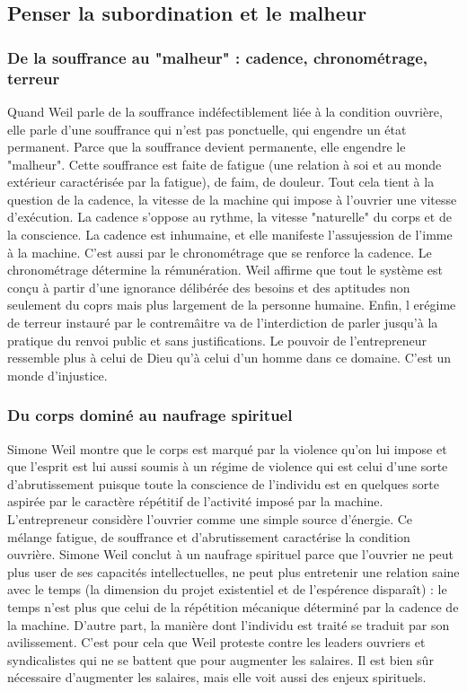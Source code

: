 \documentclass[a4paper,12pt]{book}
\begin{document}
\subsection{Penser la subordination et le malheur}
\subsubsection{De la souffrance au "malheur" : cadence, chronométrage, terreur}
Quand Weil parle de la souffrance indéfectiblement liée à la condition ouvrière, elle parle d'une souffrance qui n'est pas ponctuelle, qui engendre un état permanent. Parce que la souffrance devient permanente, elle engendre le "malheur". Cette souffrance est faite de fatigue (une relation à soi et au monde extérieur caractérisée par la fatigue), de faim, de douleur. Tout cela tient à la question de la cadence, la vitesse de la machine qui impose à l'ouvrier une vitesse d'exécution. La cadence s'oppose au rythme, la vitesse "naturelle" du corps et de la conscience. La cadence est inhumaine, et elle manifeste l'assujession de l'imme à la machine. C'est aussi par le chronométrage que se renforce la cadence. Le chronométrage détermine la rémunération. Weil affirme que tout le système est conçu à partir d'une ignorance délibérée des besoins et des aptitudes non seulement du coprs mais plus largement de la personne humaine. Enfin, l erégime de terreur instauré par le contremâitre va de l'interdiction de parler jusqu'à la pratique du renvoi public et sans justifications. Le pouvoir de l'entrepreneur ressemble plus à celui de Dieu qu'à celui d'un homme dans ce domaine. C'est un monde d'injustice.

\subsubsection{Du corps dominé au naufrage spirituel}
Simone Weil montre que le corps est marqué par la violence qu'on lui impose et que l'esprit est lui aussi soumis à un régime de violence qui est celui d'une sorte d'abrutissement puisque toute la conscience de l'individu est en quelques sorte aspirée par le caractère répétitif de l'activité imposé par la machine. L'entrepreneur considère l'ouvrier comme une simple source d'énergie. Ce mélange fatigue, de souffrance et d'abrutissement caractérise la condition ouvrière. Simone Weil conclut à un naufrage spirituel parce que l'ouvrier ne peut plus user de ses capacités intellectuelles, ne peut plus entretenir une relation saine avec le temps (la dimension du projet existentiel et de l'espérence disparaît) : le temps n'est plus que celui de la répétition mécanique déterminé par la cadence de la machine. D'autre part, la manière dont l'individu est traité se traduit par son avilissement. C'est pour cela que Weil proteste contre les leaders ouvriers et syndicalistes qui ne se battent que pour augmenter les salaires. Il est bien sûr nécessaire d'augmenter les salaires, mais elle voit aussi des enjeux spirituels.
\end{document}
